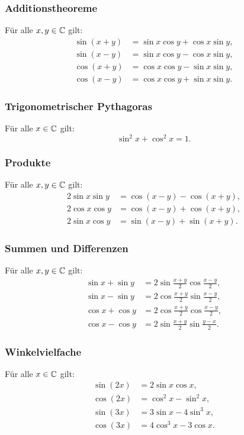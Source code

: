 \subsubsection{Additionstheoreme}

Für alle $x,y\in\mathbb C$ gilt:
\begin{align}
\sin(x+y) &= \sin x\cos y+\cos x\sin y,\\
\sin(x-y) &= \sin x\cos y-\cos x\sin y,\\
\cos(x+y) &= \cos x\cos y-\sin x\sin y,\\
\cos(x-y) &= \cos x\cos y+\sin x\sin y.
\end{align}

\subsubsection{Trigonometrischer Pythagoras}
Für alle $x\in\mathbb C$ gilt:
\begin{equation}
\sin^2 x+\cos^2 x=1.
\end{equation}

\subsubsection{Produkte}
Für alle $x,y\in\mathbb C$ gilt:
\begin{align}
2\sin x\sin y &= \cos(x-y)-\cos(x+y),\\
2\cos x\cos y &= \cos(x-y)+\cos(x+y),\\
2\sin x\cos y &= \sin(x-y)+\sin(x+y).
\end{align}

\subsubsection{Summen und Differenzen}
Für alle $x,y\in\mathbb C$ gilt:
\begin{align}
\sin x+\sin y &= 2\sin\frac{x+y}{2}\cos\frac{x-y}{2},\\
\sin x-\sin y &= 2\cos\frac{x+y}{2}\sin\frac{x-y}{2},\\
\cos x+\cos y &= 2\cos\frac{x+y}{2}\cos\frac{x-y}{2},\\
\cos x-\cos y &= 2\sin\frac{x+y}{2}\sin\frac{y-x}{2}.
\end{align}

\subsubsection{Winkelvielfache}
Für alle $x\in\mathbb C$ gilt:
\begin{align}
\sin(2x) &= 2\sin x\cos x,\\
\cos(2x) &= \cos^2 x-\sin^2 x,\\
\sin(3x) &= 3\sin x-4\sin^3 x,\\
\cos(3x) &= 4\cos^3 x-3\cos x.
\end{align}
